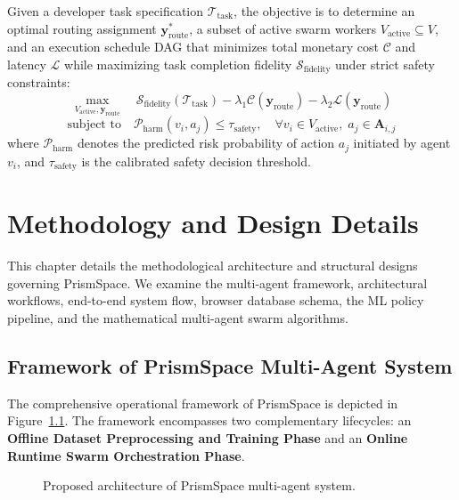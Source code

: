 \documentclass[12pt,a4paper]{report}
\begin{document}
Given a developer task specification $\mathcal{T}_{\text{task}}$, the objective is to determine an optimal routing assignment $\mathbf{y}_{\text{route}}^*$, a subset of active swarm workers $V_{\text{active}} \subseteq V$, and an execution schedule DAG that minimizes total monetary cost $\mathcal{C}$ and latency $\mathcal{L}$ while maximizing task completion fidelity $\mathcal{S}_{\text{fidelity}}$ under strict safety constraints:
\begin{equation}
    \max_{V_{\text{active}}, \mathbf{y}_{\text{route}}} \quad \mathcal{S}_{\text{fidelity}}(\mathcal{T}_{\text{task}}) - \lambda_1 \mathcal{C}(\mathbf{y}_{\text{route}}) - \lambda_2 \mathcal{L}(\mathbf{y}_{\text{route}})
\end{equation}
\begin{equation}
    \text{subject to} \quad \mathcal{P}_{\text{harm}}(v_i, a_j) \le \tau_{\text{safety}}, \quad \forall v_i \in V_{\text{active}}, \; a_j \in \mathbf{A}_{i,j}
\end{equation}
where $\mathcal{P}_{\text{harm}}$ denotes the predicted risk probability of action $a_j$ initiated by agent $v_i$, and $\tau_{\text{safety}}$ is the calibrated safety decision threshold.


\chapter{Methodology and Design Details}

This chapter details the methodological architecture and structural designs governing PrismSpace. We examine the multi-agent framework, architectural workflows, end-to-end system flow, browser database schema, the ML policy pipeline, and the mathematical multi-agent swarm algorithms.

\section{Framework of PrismSpace Multi-Agent System}
The comprehensive operational framework of PrismSpace is depicted in Figure~\ref{fig:framework}. The framework encompasses two complementary lifecycles: an \textbf{Offline Dataset Preprocessing and Training Phase} and an \textbf{Online Runtime Swarm Orchestration Phase}.

\begin{figure}[H]
    \centering
    \caption{Proposed architecture of PrismSpace multi-agent system.}
    \label{fig:framework}
\end{figure}
\end{document}
